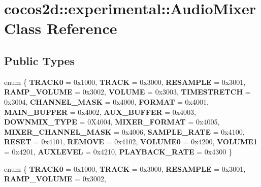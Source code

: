 \hypertarget{classcocos2d_1_1experimental_1_1AudioMixer}{}\section{cocos2d\+:\+:experimental\+:\+:Audio\+Mixer Class Reference}
\label{classcocos2d_1_1experimental_1_1AudioMixer}
\subsection*{Public Types}
\begin{DoxyCompactItemize}
\item 
\mbox{\label{classcocos2d_1_1experimental_1_1AudioMixer_a087df9e57854419e94d7b3ce479592be}} 
enum \{ \newline
{\bfseries T\+R\+A\+C\+K0} = 0x1000, 
{\bfseries T\+R\+A\+CK} = 0x3000, 
{\bfseries R\+E\+S\+A\+M\+P\+LE} = 0x3001, 
{\bfseries R\+A\+M\+P\+\_\+\+V\+O\+L\+U\+ME} = 0x3002, 
\newline
{\bfseries V\+O\+L\+U\+ME} = 0x3003, 
{\bfseries T\+I\+M\+E\+S\+T\+R\+E\+T\+CH} = 0x3004, 
{\bfseries C\+H\+A\+N\+N\+E\+L\+\_\+\+M\+A\+SK} = 0x4000, 
{\bfseries F\+O\+R\+M\+AT} = 0x4001, 
\newline
{\bfseries M\+A\+I\+N\+\_\+\+B\+U\+F\+F\+ER} = 0x4002, 
{\bfseries A\+U\+X\+\_\+\+B\+U\+F\+F\+ER} = 0x4003, 
{\bfseries D\+O\+W\+N\+M\+I\+X\+\_\+\+T\+Y\+PE} = 0\+X4004, 
{\bfseries M\+I\+X\+E\+R\+\_\+\+F\+O\+R\+M\+AT} = 0x4005, 
\newline
{\bfseries M\+I\+X\+E\+R\+\_\+\+C\+H\+A\+N\+N\+E\+L\+\_\+\+M\+A\+SK} = 0x4006, 
{\bfseries S\+A\+M\+P\+L\+E\+\_\+\+R\+A\+TE} = 0x4100, 
{\bfseries R\+E\+S\+ET} = 0x4101, 
{\bfseries R\+E\+M\+O\+VE} = 0x4102, 
\newline
{\bfseries V\+O\+L\+U\+M\+E0} = 0x4200, 
{\bfseries V\+O\+L\+U\+M\+E1} = 0x4201, 
{\bfseries A\+U\+X\+L\+E\+V\+EL} = 0x4210, 
{\bfseries P\+L\+A\+Y\+B\+A\+C\+K\+\_\+\+R\+A\+TE} = 0x4300
 \}
\item 
\mbox{\label{classcocos2d_1_1experimental_1_1AudioMixer_a075ea2e9f693613d290522810c58f445}} 
enum \{ \newline
{\bfseries T\+R\+A\+C\+K0} = 0x1000, 
{\bfseries T\+R\+A\+CK} = 0x3000, 
{\bfseries R\+E\+S\+A\+M\+P\+LE} = 0x3001, 
{\bfseries R\+A\+M\+P\+\_\+\+V\+O\+L\+U\+ME} = 0x3002, 

\end{DoxyCompactItemize}
